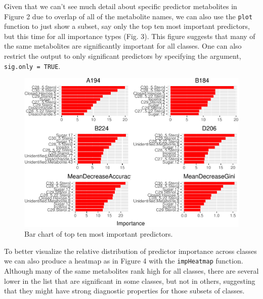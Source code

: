Given that we can't see much detail about specific predictor metabolites
in Figure 2 due to overlap of all of the metabolite names, we can also
use the \texttt{plot} function to just show a subset, say only the top
ten most important predictors, but this time for all importance types
(Fig. 3). This figure suggests that many of the same metabolites are
significantly important for all classes. One can also restrict the
output to only significant predictors by specifying the argument,
\texttt{sig.only\ =\ TRUE}.

\begin{Schunk}
\begin{figure}
\includegraphics{archer_files/figure-latex/plot_imp2-1} \caption[Bar chart of top ten most important predictors]{Bar chart of top ten most important predictors.}\label{fig:plot_imp2}
\end{figure}
\end{Schunk}

To better visualize the relative distribution of predictor importance
across classes we can also produce a heatmap as in Figure 4 with the
\texttt{impHeatmap} function. Although many of the same metabolites rank
high for all classes, there are several lower in the list that are
significant in some classes, but not in others, suggesting that they
might have strong diagnostic properties for those subsets of classes.

